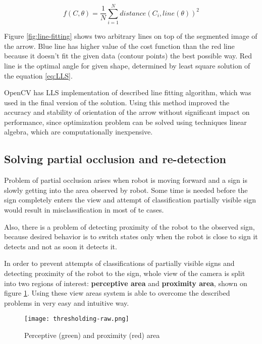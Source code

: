 \begin{equation}
f(C,\theta)=
\frac{1}{N}
\sum_{i=1}^{N}distance(C_i, line(\theta))^2
\label{eq:LLS}
\end{equation}

Figure \ref{fig:line-fitting} shows two arbitrary lines on top of the segmented image of the arrow. Blue line has higher value of the cost function than the red line because it doesn't fit the given data (contour points) the best possible way. Red line is the optimal angle for given shape, determined by least square solution of the equation \ref{eq:LLS}.

OpenCV has LLS implementation of described line fitting algorithm, which was used in the final version of the solution. Using this method improved the accuracy and stability of orientation of the arrow without significant impact on performance, since optimization problem can be solved using techniques linear algebra, which are computationally inexpensive.

\subsection{Solving partial occlusion and re-detection}

Problem of partial occlusion arises when robot is moving forward and a sign is slowly getting into the area observed by robot. Some time is needed before the sign completely enters the view and attempt of classification partially visible sign would result in misclassification in most of te cases.

Also, there is a problem of detecting proximity of the robot to the observed sign, because desired behavior is to switch states only when the robot is close to sign it detects and not as soon it detects it.

In order to prevent attempts of classifications of partially visible signs and detecting proximity of the robot to the sign, whole view of the camera is split into two regions of interest: \textbf{perceptive area} and \textbf{proximity area}, shown on figure \ref{fig:camera-view-areas}. Using these view areas system is able to overcome the described problems in very easy and intuitive way.

\begin{figure}[th!]
	\centering
		\texttt{[image: thresholding-raw.png]}
	\caption{Perceptive (green) and proximity (red) area}
	\label{fig:camera-view-areas}
\end{figure}

